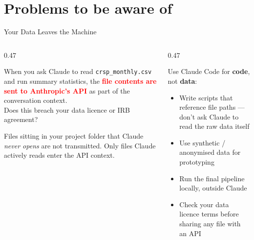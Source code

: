 \documentclass[aspectratio=169, 11pt]{beamer}
\newcommand{\emphgold}[1]{\alert{\textbf{#1}}}
\newcommand{\emphcoral}[1]{\textcolor{red}{\textbf{#1}}}
\begin{document}
\section{Problems to be aware of}


\begin{frame}{Your Data Leaves the Machine}
\begin{columns}[T]
\begin{column}{0.47\textwidth}
  \begin{warningbox}
    When you ask Claude to read \texttt{crsp\_monthly.csv} and run summary statistics, the \emphcoral{file contents are sent to Anthropic's API} as part of the conversation context.\\[6pt]
    {\small Does this breach your data licence or IRB agreement?}
  \end{warningbox}
  \vspace{0.1cm}
  {\small\color{slate} Files sitting in your project folder that Claude \emph{never opens} are not transmitted. Only files Claude actively reads enter the API context.}
\end{column}
\begin{column}{0.47\textwidth}
  \begin{keyinsight}
    Use Claude Code for \emphgold{code}, not \emphgold{data}:
    \begin{itemize}\small
      \item Write scripts that reference file paths --- don't ask Claude to read the raw data itself
      \item Use synthetic / anonymised data for prototyping
      \item Run the final pipeline locally, outside Claude
      \item Check your data licence terms before sharing any file with an API
    \end{itemize}
  \end{keyinsight}
\end{column}
\end{columns}
\end{frame}
\end{document}
